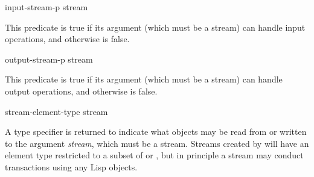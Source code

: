 \begin{defun}[Function]
input-stream-p stream

This predicate is true if its argument (which must be a stream) can handle
input operations, and otherwise is false.
\end{defun}

\begin{defun}[Function]
output-stream-p stream

This predicate is true if its argument (which must be a stream) can handle
output operations, and otherwise is false.
\end{defun}

\begin{defun}[Function]
stream-element-type stream

A type specifier is returned to indicate what objects
may be read from or written to the argument \emph{stream}, which must be a stream.
Streams created by  will have an element type
restricted to a subset of  or ,
but in principle a stream may conduct transactions using any
Lisp objects.
\end{defun}

